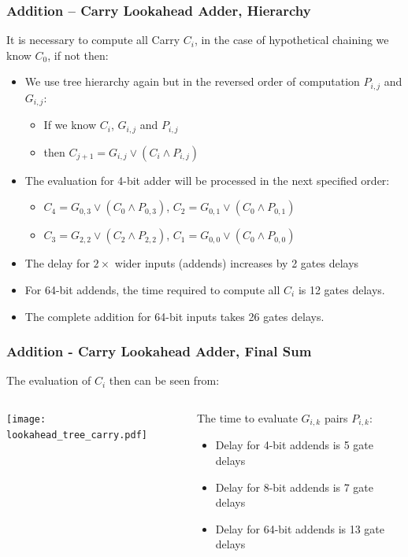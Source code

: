\documentclass{beamer}
\begin{document}
\begin{frame}
\frametitle{Addition -- Carry Lookahead Adder, Hierarchy}

It is necessary to compute all Carry $C_i$, in the case of hypothetical chaining we know $C_0$, if not then:
\begin{itemize}
\item We use tree hierarchy again but in the reversed order of computation $P_{i,j}$ and $G_{i,j}$:
\begin{itemize}
\item If we know $C_i$, $G_{i,j}$ and $P_{i,j}$
\item then $C_{j+1} = G_{i,j} \lor (C_i \land P_{i,j})$ 
\end{itemize}
\item The evaluation for 4-bit adder will be processed in the next specified order:
\begin{itemize}
\item $C_4 = G_{0,3} \lor (C_0 \land P_{0,3})$, $C_2 = G_{0,1} \lor (C_0 \land P_{0,1})$
\item $C_3 = G_{2,2} \lor (C_2 \land P_{2,2})$, $C_1 = G_{0,0} \lor (C_0 \land P_{0,0})$
\end{itemize}
\item The delay for $2\times$ wider inputs (addends) increases by 2 gates delays 
\item For 64-bit addends, the time required to compute all $C_i$ is 12 gates delays.
\item The complete addition for 64-bit inputs takes 26 gates delays.
\end{itemize}

\end{frame}


\begin{frame}
\frametitle{Addition - Carry Lookahead Adder, Final Sum}

The evaluation of $C_i$ then can be seen from:
\begin{columns}
\begin{column}{0.5\textwidth}
\begin{center}
   \texttt{[image: lookahead\_tree\_carry.pdf]}
\end{center}
\end{column}
\begin{column}{0.5\textwidth}

The time to evaluate $G_{i,k}$ pairs $P_{i,k}$:
\begin{itemize}
\item Delay for 4-bit addends is 5 gate delays
\item Delay for 8-bit addends is 7 gate delays
\item Delay for 64-bit addends is 13 gate delays
\end{itemize}

\end{column}
\end{columns}

\end{frame}
\end{document}
